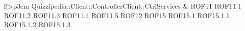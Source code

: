 \begin{tabella}{l!{\VRule}>{\centering\arraybackslash}p{3cm}}
Quizzipedia::Client::ControllerClient::CtrlServices & ROF11 \linebreak ROF11.1 \linebreak ROF11.2 \linebreak ROF11.3 \linebreak ROF11.4 \linebreak ROF11.5 \linebreak ROF12 \linebreak ROF15 \linebreak ROF15.1 \linebreak ROF15.1.1 \linebreak ROF15.1.2 \linebreak ROF15.1.3 \li
\end{tabella}

